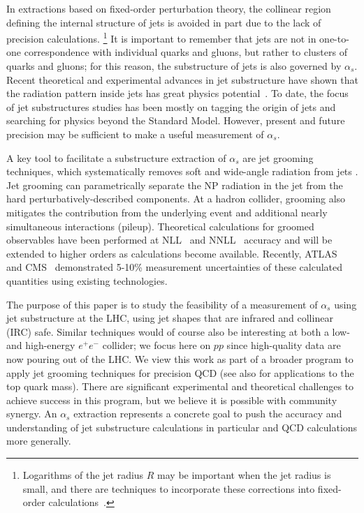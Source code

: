 In extractions based on fixed-order perturbation theory, the collinear region defining the internal
structure of jets is avoided in part due to the lack of precision calculations.%
\footnote{Logarithms of the jet radius $R$ may be important when the jet radius is small, and there are techniques to incorporate these corrections into fixed-order calculations~\cite{Dasgupta:2016bnd,Dasgupta:2014yra}.}
%
It is important to remember that jets are not in one-to-one correspondence with individual quarks and gluons, but rather to clusters of quarks and gluons; for this reason, the substructure of jets is also governed by $\alpha_s$.
%
Recent theoretical and experimental advances in jet substructure have shown that the radiation pattern inside jets has great physics potential~\cite{Abdesselam:2010pt,Altheimer:2012mn,Altheimer:2013yza,Adams:2015hiv,Larkoski:2017jix}.
%
To date, the focus of jet substructures studies has been mostly on tagging the origin of jets and searching for physics beyond the Standard Model.
%
However, present and future precision may be sufficient to make a useful measurement of $\alpha_s$.

A key tool to facilitate a substructure extraction of $\alpha_s$ are jet grooming techniques, which systematically removes soft and wide-angle radiation from jets \cite{Butterworth:2008iy,Ellis:2009su,Ellis:2009me,Krohn:2009th,Dasgupta:2013ihk,Larkoski:2014wba}.
%
Jet grooming can parametrically separate the NP radiation in the jet from the hard perturbatively-described components.
%
At a hadron collider, grooming also mitigates the contribution from the underlying event and additional nearly simultaneous interactions (pileup).
%
Theoretical calculations for groomed observables have been performed at NLL~\cite{Marzani:2017kqd,Marzani:2017mva} and NNLL~\cite{Frye:2016aiz,Frye:2016okc} accuracy and will be extended to higher orders as calculations become available.
%
Recently, ATLAS~\cite{Aaboud:2017qwh} and CMS~\cite{CMS-PAS-SMP-16-010} demonstrated 5-10\% measurement uncertainties of these calculated quantities using existing technologies.

The purpose of this paper is to study the feasibility of a measurement of $\alpha_s$ using jet substructure at the LHC, using jet shapes that are infrared and collinear (IRC) safe.
%
Similar techniques would of course also be interesting at both a low- and high-energy $e^+e^-$ collider; we focus here on $pp$ since high-quality data are now pouring out of the LHC.
%
We view this work as part of a broader program to apply jet grooming techniques for precision QCD (see also  for
applications to the top quark mass).
%
There are significant experimental and theoretical challenges to achieve success in this program, but we believe it is possible with community synergy.
%
An $\alpha_s$ extraction represents a concrete goal to push the accuracy and understanding of jet substructure calculations in particular and QCD calculations more generally.

